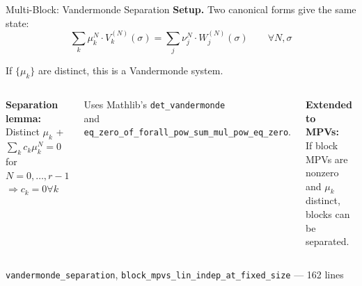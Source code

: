 \documentclass[aspectratio=169,10pt]{beamer}
\begin{document}
\begin{frame}{Multi-Block: Vandermonde Separation}
\vspace{-0.5em}
{\small\textbf{Setup.} Two canonical forms give the same state:}
\vspace{-0.5em}
\[
\sum_k \mu_k^N \cdot V_k^{(N)}(\sigma) = \sum_j \nu_j^N \cdot W_j^{(N)}(\sigma) \qquad \forall  N, \sigma
\]
\vspace{-0.7em}

{\small If $\{\mu_k\}$ are distinct, this is a Vandermonde system.}

\vspace{0.1em}
\begin{columns}[T]
{\small\textbf{Separation lemma:}\\
Distinct $\mu_k$ + $\sum_k c_k \mu_k^N = 0$ for $N=0,\dots,r{-}1$\\
$\Longrightarrow  c_k = 0 \forall k$}

\vspace{0.2em}
{\small Uses Mathlib's \texttt{det\_vandermonde}\\
and \texttt{eq\_zero\_of\_forall\_pow\_sum\_mul\_pow\_eq\_zero}.}

\vspace{0.2em}
{\small\textbf{Extended to MPVs:}\\
If block MPVs are nonzero and $\mu_k$ distinct, blocks can be separated.}

\begin{center}
\end{center}
\end{columns}

\vspace{0.1em}
{\small\textcolor{leangreen}{\checkmark}  \texttt{vandermonde\_separation}, \texttt{block\_mpvs\_lin\_indep\_at\_fixed\_size} --- 162 lines}
\end{frame}
\end{document}

